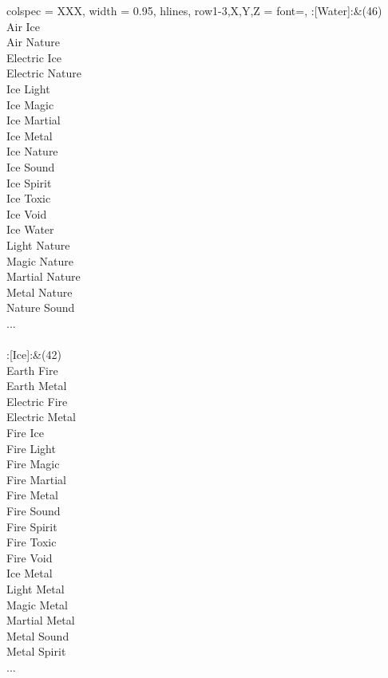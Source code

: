 \begin{longtblr}[
	caption = {1v2 Attacking Ineffective},
	label = {1v2-Attacking-Ineffective},
]{
	colspec = {XXX}, width = 0.95\linewidth,
	hlines,
	row{1-3,X,Y,Z} = {font=\bfseries},
}
	:[Water]:&{(46)\\
	Air Ice \\
	Air Nature \\
	Electric Ice \\
	Electric Nature \\
	Ice Light \\
	Ice Magic \\
	Ice Martial \\
	Ice Metal \\
	Ice Nature \\
	Ice Sound \\
	Ice Spirit \\
	Ice Toxic \\
	Ice Void \\
	Ice Water \\
	Light Nature \\
	Magic Nature \\
	Martial Nature \\
	Metal Nature \\
	Nature Sound \\
	...\\
	}\\

	:[Ice]:&{(42)\\
	Earth Fire \\
	Earth Metal \\
	Electric Fire \\
	Electric Metal \\
	Fire Ice \\
	Fire Light \\
	Fire Magic \\
	Fire Martial \\
	Fire Metal \\
	Fire Sound \\
	Fire Spirit \\
	Fire Toxic \\
	Fire Void \\
	Ice Metal \\
	Light Metal \\
	Magic Metal \\
	Martial Metal \\
	Metal Sound \\
	Metal Spirit \\
	...\\
	}\\


\end{longtblr}
